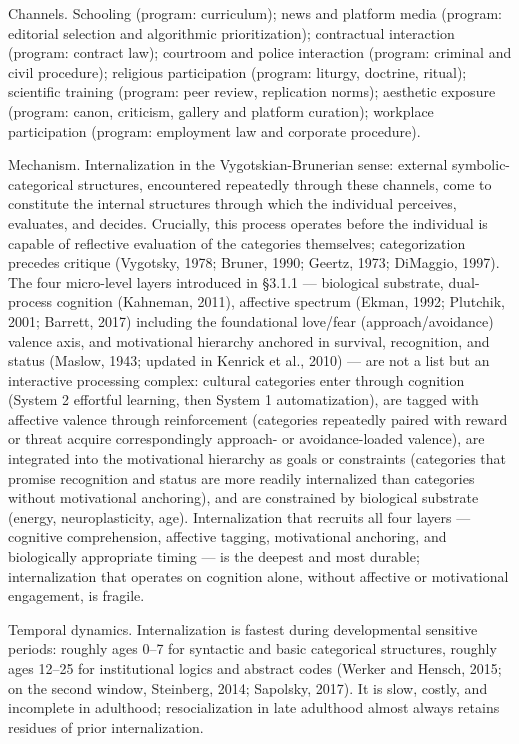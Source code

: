 \documentclass[12pt,a4paper]{article}
\begin{document}
Channels. Schooling (program: curriculum); news and platform media (program: editorial selection and algorithmic prioritization); contractual interaction (program: contract law); courtroom and police interaction (program: criminal and civil procedure); religious participation (program: liturgy, doctrine, ritual); scientific training (program: peer review, replication norms); aesthetic exposure (program: canon, criticism, gallery and platform curation); workplace participation (program: employment law and corporate procedure).


Mechanism. Internalization in the Vygotskian-Brunerian sense: external symbolic-categorical structures, encountered repeatedly through these channels, come to constitute the internal structures through which the individual perceives, evaluates, and decides. Crucially, this process operates before the individual is capable of reflective evaluation of the categories themselves; categorization precedes critique (Vygotsky, 1978; Bruner, 1990; Geertz, 1973; DiMaggio, 1997). The four micro-level layers introduced in §3.1.1 --- biological substrate, dual-process cognition (Kahneman, 2011), affective spectrum (Ekman, 1992; Plutchik, 2001; Barrett, 2017) including the foundational love/fear (approach/avoidance) valence axis, and motivational hierarchy anchored in survival, recognition, and status (Maslow, 1943; updated in Kenrick et al., 2010) --- are not a list but an interactive processing complex: cultural categories enter through cognition (System 2 effortful learning, then System 1 automatization), are tagged with affective valence through reinforcement (categories repeatedly paired with reward or threat acquire correspondingly approach- or avoidance-loaded valence), are integrated into the motivational hierarchy as goals or constraints (categories that promise recognition and status are more readily internalized than categories without motivational anchoring), and are constrained by biological substrate (energy, neuroplasticity, age). Internalization that recruits all four layers --- cognitive comprehension, affective tagging, motivational anchoring, and biologically appropriate timing --- is the deepest and most durable; internalization that operates on cognition alone, without affective or motivational engagement, is fragile.


Temporal dynamics. Internalization is fastest during developmental sensitive periods: roughly ages 0--7 for syntactic and basic categorical structures, roughly ages 12--25 for institutional logics and abstract codes (Werker and Hensch, 2015; on the second window, Steinberg, 2014; Sapolsky, 2017). It is slow, costly, and incomplete in adulthood; resocialization in late adulthood almost always retains residues of prior internalization.
\end{document}
